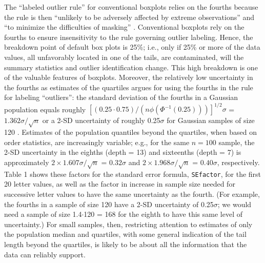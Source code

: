 \documentclass[oneside]{article}
\begin{document}
The ``labeled outlier rule'' for conventional boxplots relies 
on the fourths because the rule is then
``unlikely to be adversely affected by extreme
observations'' and ``to minimize the difficulties of masking'' \citep{dchbox, page=992}.
Conventional boxplots rely on the fourths to ensure
insensitivity to the rule governing outlier labeling.
Hence, the breakdown point of default box plots is 25\%; 
i.e., only if 25\% or more of the data values, all unfavorably
located in one of the tails, are contaminated,
will the summary statistics and outlier identification change.
This high breakdown is one of the valuable features of boxplots.  
Moreover, the relatively low uncertainty in the fourths as 
estimates of the quartiles argues for using the fourths 
in the rule for labeling ``outliers'': the standard deviation 
of the fourths in a Gaussian population equals roughly 
$[(0.25 \cdot 0.75) / (n  \phi(\Phi^{-1}(0.25)))]^{1/2} \sigma$
= $1.362 \sigma / \sqrt{n}$ 
or a 2-SD uncertainty
of roughly 0.25$\sigma$ for Gaussian samples of size 120 
\citep{ha.order}.
Estimates of the population quantiles beyond the quartiles, when
based on order statistics, are increasingly variable; e.g., for
the same $n = 100$ sample, the 2-SD uncertainty in the eighths
(depth = 13) and sixteenths (depth = 7) is approximately
$ 2 \times 1.607 \sigma / \sqrt{n}$ = $0.32 \sigma$ and
$ 2 \times 1.968 \sigma / \sqrt{n}$ = $0.40 \sigma$, respectively.
Table 1 shows these factors for the standard error formula,
\texttt{SEfactor}, for the first 20 letter values, as well as
the factor in increase in sample size needed for successive
letter values to have the same uncertainty as the fourth.
(For example, the fourths in a sample of size 120 have
a 2-SD uncertainty of 0.25$\sigma$; we would need a sample
of size 1.4$\cdot$120 = 168 for the eighth to have this
same level of uncertainty.)
For small samples, then, restricting attention to estimates of only
the population median and quartiles, with some general indication of 
the tail length beyond the quartiles, is likely to be about all the
information that the data can reliably support.
\end{document}
